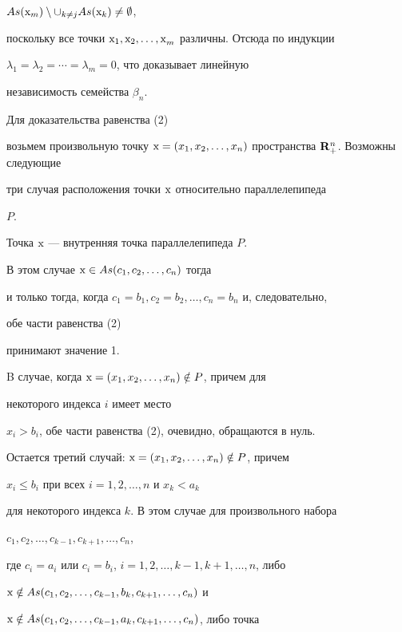 $As(\mathrm{x}_m)\setminus\cup_{k\ne j}As(\mathrm{x}_k)\ne\emptyset$, 


поскольку все точки $\mathrm{x_1,x_2,\dotsc,x}_m$ различны. Отсюда по индукции  


$\lambda_1=\lambda_2=\dotsb=\lambda_m=0$, что доказывает линейную 


независимость семейства $\beta_n$. 


 


Для доказательства равенства (2)  


возьмем произвольную точку $\mr{x}=(x_1,x_2,\dotsc,x_n)$ пространства $\bold 


R^n_+$. Возможны следующие  


три случая расположения точки $\mathrm{x}$ относительно параллелепипеда  


$P$. 


 


Точка $\mathrm{x}$ --- внутренняя точка параллелепипеда $P$. 


В этом случае $\mathrm{x}\in As(c_1,c_2,\dotsc,c_n)$ тогда  


и только тогда, когда $c_1=b_1,c_2=b_2,\dotsc,c_n=b_n$ и, следовательно, 


обе части равенства (2)  


принимают значение 1. 


 


B случае, когда $\mathrm{x}=(x_1,x_2,\dotsc,x_n)\notin P$, причем для 


некоторого индекса $i$ имеет место  


$x_i>b_i$, обе части равенства (2), очевидно, обращаются в нуль. 


 


Остается третий случай: $\mathrm{x}=(x_1,x_2,\dotsc,x_n)\notin P$, причем 


$x_i\le b_i$ при всех $i=1,2,\dotsc,n$ и $x_k<a_k$ 


для некоторого индекса $k$. В этом случае для произвольного набора 


$c_1,c_2,\dotsc,c_{k-1},c_{k+1},\dotsc,c_n$, 


где $c_i=a_i$ или $c_i=b_i$, $i=1,2,\dotsc,k-1,k+1,\dotsc,n$, либо 


$\mathrm{x}\notin As(c_1,c_2,\dotsc,c_{k-1},b_k,c_{k+1},\dotsc,c_n)$ и  


$\mathrm{x}\notin As(c_1,c_2,\dotsc,c_{k-1},a_k,c_{k+1},\dotsc,c_n)$, либо точка 


